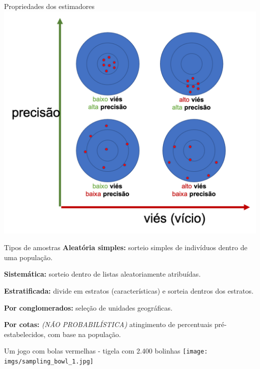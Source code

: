 \documentclass[
  9pt,
  ignorenonframetext,
  aspectratio=169]{beamer}
\begin{document}
\begin{frame}{Propriedades dos estimadores}
\protect\hypertarget{propriedades-dos-estimadores}{}
\includegraphics{imgs/prop_estimadores.png}
\end{frame}

\begin{frame}{Tipos de amostras}
\protect\hypertarget{tipos-de-amostras}{}
\textbf{Aleatória simples:} sorteio simples de indivíduos dentro de uma
população.

\textbf{Sistemática:} sorteio dentro de listas aleatoriamente
atribuídas.

\textbf{Estratificada:} divide em estratos (características) e sorteia
dentros dos estratos.

\textbf{Por conglomerados:} seleção de unidades geográficas.

\textbf{Por cotas:} \emph{(NÃO PROBABILÍSTICA)} atingimento de
percentuais pré-estabelecidos, com base na população.
\end{frame}

\begin{frame}{Um jogo com bolas vermelhas - tigela com 2.400 bolinhas}
\protect\hypertarget{um-jogo-com-bolas-vermelhas---tigela-com-2.400-bolinhas}{}
\texttt{[image: imgs/sampling\_bowl\_1.jpg]}
\end{frame}
\end{document}
